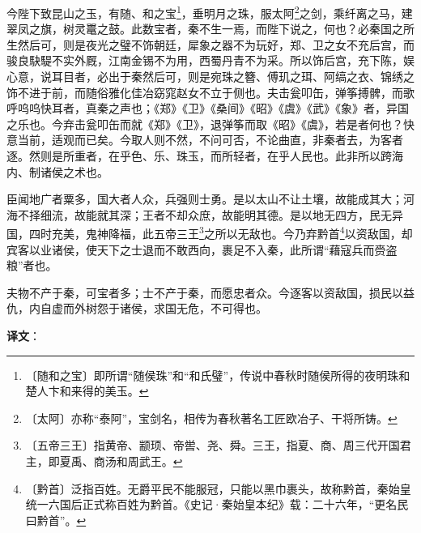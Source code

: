 \documentclass[12pt,UTF-8,openany,a4]{ctexbook}
\begin{document}
\begin{large}
    今陛下致昆山之玉，有随、和之宝\footnote{〔随和之宝〕\yiwen 即所谓“随侯珠”和“和氏璧”，传说中春秋时随侯所得的夜明珠和楚人卞和来得的美玉。}，垂明月之珠，服太阿\footnote{〔太阿〕\yiwen 亦称“泰阿”，宝剑名，相传为春秋著名工匠欧冶子、干将所铸。}之剑，乘纤离之马，建翠凤之旗，树灵鼍之鼓。此数宝者，秦不生一焉，而陛下说之，何也？必秦国之所生然后可，则是夜光之璧不饰朝廷，犀象之器不为玩好，郑、卫之女不充后宫，而骏良駃騠不实外厩，江南金锡不为用，西蜀丹青不为采。所以饰后宫，充下陈，娱心意，说耳目者，必出于秦然后可，则是宛珠之簪、傅玑之珥、阿缟之衣、锦绣之饰不进于前，而随俗雅化佳冶窈窕赵女不立于侧也。夫击瓮叩缶，弹筝搏髀，而歌呼呜呜快耳者，真秦之声也；《郑》《卫》《桑间》《昭》《虞》《武》《象》者，异国之乐也。今弃击瓮叩缶而就《郑》《卫》，退弹筝而取《昭》《虞》，若是者何也？快意当前，适观而已矣。今取人则不然，不问可否，不论曲直，非秦者去，为客者逐。然则是所重者，在乎色、乐、珠玉，而所轻者，在乎人民也。此非所以跨海内、制诸侯之术也。
    
    臣闻地广者粟多，国大者人众，兵强则士勇。是以太山不让土壤，故能成其大；河海不择细流，故能就其深；王者不却众庶，故能明其德。是以地无四方，民无异国，四时充美，鬼神降福，此五帝三王\footnote{〔五帝三王〕\yiwen 指黄帝、颛顼、帝喾、尧、舜。三王，指夏、商、周三代开国君主，即夏禹、商汤和周武王。}之所以无敌也。今乃弃黔首\footnote{〔黔首〕\yiwen 泛指百姓。无爵平民不能服冠，只能以黑巾裹头，故称黔首，秦始皇统一六国后正式称百姓为黔首。《史记·秦始皇本纪》载：二十六年，“更名民曰黔首”。}以资敌国，却宾客以业诸侯，使天下之士退而不敢西向，裹足不入秦，此所谓“藉寇兵而赍盗粮”者也。
    
    夫物不产于秦，可宝者多；士不产于秦，而愿忠者众。今逐客以资敌国，损民以益仇，内自虚而外树怨于诸侯，求国无危，不可得也。

\end{large}


\newpage

\begin{Large}
   \noindent \textbf{译文}：
\end{Large}

\vspace{1em}
\end{document}
